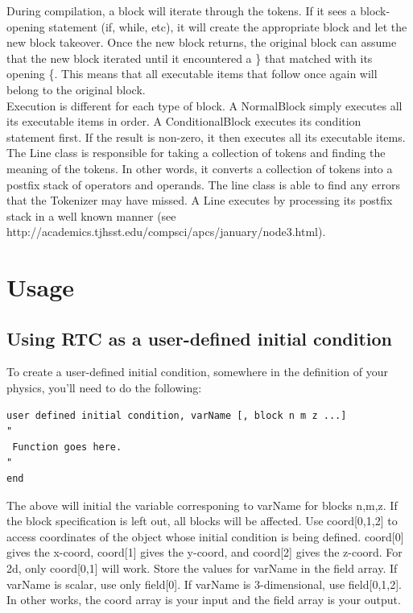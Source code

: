 \documentclass{article}
\begin{document}
\noindent 
During compilation, a block will iterate through the tokens. If it sees a 
block-opening statement (if, while, etc), it will create the appropriate
block and let the new block takeover. Once the new block returns, the original
block can assume that the new block iterated until it encountered a \} that
matched with its opening \{. This means that all executable items that follow
once again will belong to the original block. \\

\noindent 
Execution is different for each type of block. A NormalBlock simply executes
all its executable items in order. A ConditionalBlock executes its condition
statement first. If the result is non-zero, it then executes all its executable
items. \\

\noindent
The Line class is responsible for taking a collection of tokens and finding 
the meaning of the tokens. In other words, it converts a collection of tokens
into a postfix stack of operators and operands. The line class is able to find
any errors that the Tokenizer may have missed. A Line executes by processing
its postfix stack in a well known manner 
(see http://academics.tjhsst.edu/compsci/apcs/january/node3.html). 

\section{Usage}

\subsection{Using RTC as a user-defined initial condition}

To create a user-defined initial condition, somewhere in the definition of 
your physics, you'll need to do the following:

{\ttfamily \begin{verbatim}
user defined initial condition, varName [, block n m z ...]
"
 Function goes here. 
"
end
\end{verbatim} }

\noindent
The above will initial the variable corresponing to varName for blocks n,m,z.
If the block specification is left out, all blocks will be affected. 
Use coord[0,1,2] to access coordinates of the object whose initial condition 
is being defined. coord[0] gives the x-coord, coord[1] gives the y-coord, and
coord[2] gives the z-coord. For 2d, only coord[0,1] will work. Store the 
values for varName in the field array. If varName is scalar, use only field[0].
If varName is 3-dimensional, use field[0,1,2]. In other works, the coord array 
is your input and the field array is your output.\\
\end{document}
